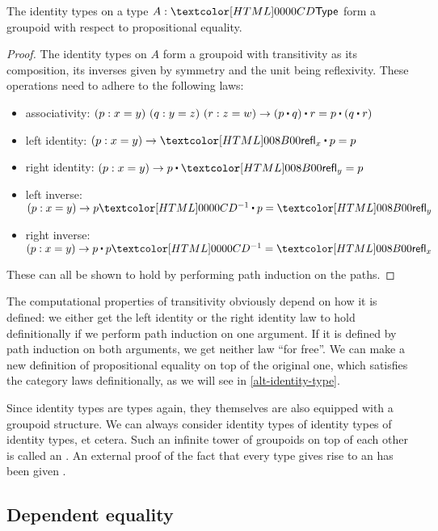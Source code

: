 \begin{lemma}
  The identity types on a type $A : \Type$ form a groupoid with
  respect to propositional equality.
\end{lemma}

\begin{proof}
  The identity types on $A$ form a groupoid with transitivity as its
  composition, its inverses given by symmetry and the unit being
  reflexivity. These operations need to adhere to the following laws:
  \begin{itemize}
  \item associativity: $(p : x = y)\ (q : y = z)\ (r : z = w) \to \trans{(\trans{p}{q})}{r} = \trans{p}{(\trans{q}{r})}$
  \item left identity: $(p : x = y) \to \trans{\refl_x}{p} = p$
  \item right identity: $(p : x = y) \to \trans{p}{\refl_y} = p$
  \item left inverse: $(p : x = y) \to \trans{\sym{p}}{p} = \refl_y$
  \item right inverse: $(p : x = y) \to \trans{p}{\sym{p}} = \refl_x$
  \end{itemize}
  These can all be shown to hold by performing path induction on the
  paths.
\end{proof}

\begin{remark}
  The computational properties of transitivity obviously depend on how
  it is defined: we either get the left identity or the right identity
  law to hold definitionally if we perform path induction on one
  argument. If it is defined by path induction on both arguments, we
  get neither law ``for free''. We can make a new definition of
  propositional equality on top of the original one, which satisfies
  the category laws definitionally, as we will see in
  \cref{alt-identity-type}.
\end{remark}

Since identity types are types again, they themselves are also
equipped with a groupoid structure. We can always consider identity
types of identity types of identity types, et cetera. Such an infinite
tower of groupoids on top of each other is called an \inftygrpd. An
external proof of the fact that every type gives rise to an \inftygrpd
has been given \cite{VanDenBerg2011,Lumsdaine2009}.

\subsection{Dependent equality}

